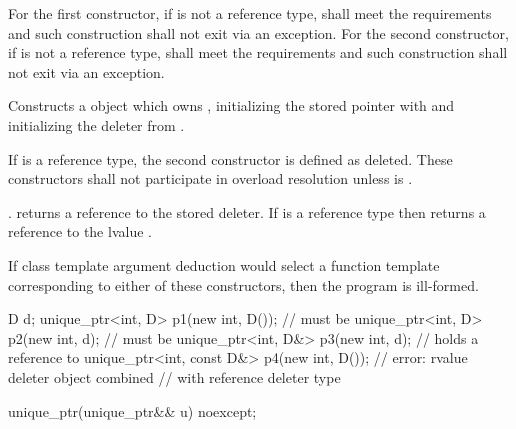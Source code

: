 \begin{itemdescr}
\pnum
\requires For the first constructor, if  is not a reference type,
 shall meet the  requirements and
such construction shall not exit via an exception.
For the second constructor, if  is not a reference type,
 shall meet the  requirements and
such construction shall not exit via an exception.

\pnum
\effects
Constructs a  object which owns , initializing
the stored pointer with  and initializing the deleter
from .

\pnum
\remarks
If  is a reference type,
the second constructor is defined as deleted.
These constructors shall not participate in overload resolution
unless  is .

\pnum
\ensures
{}.
 returns a reference to the stored
deleter. If  is a reference type then 
returns a reference to the lvalue .

\pnum
\remarks
If class template argument deduction
would select a function template corresponding to either of these constructors,
then the program is ill-formed.

\pnum
\begin{example}
\begin{codeblock}
D d;
unique_ptr<int, D> p1(new int, D());        //  must be 
unique_ptr<int, D> p2(new int, d);          //  must be 
unique_ptr<int, D&> p3(new int, d);         //  holds a reference to 
unique_ptr<int, const D&> p4(new int, D()); // error: rvalue deleter object combined
                                            // with reference deleter type
\end{codeblock}
\end{example}
\end{itemdescr}

%
\begin{itemdecl}
unique_ptr(unique_ptr&& u) noexcept;
\end{itemdecl}

